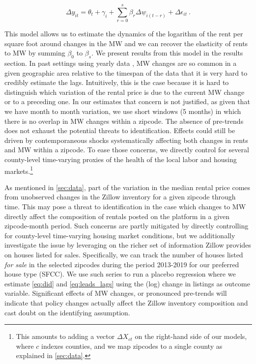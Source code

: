 \begin{equation}\label{eq:lags}
        \Delta y_{it} = \theta_t + \gamma_i 
        		+ \sum_{r=0}^{s}\beta_r \Delta \underline{w}_{i(t-r)} 
        		+ \Delta \epsilon_{it} \ .
\end{equation}

This model allows us to estimate the dynamics of the logarithm of the rent per square foot around 
changes in the MW and we can recover the elasticity of rents to MW by summing $\beta_0$ to 
$\beta_{s}$. We present results from this model in the results section. In past settings using 
yearly data \parencite{Tidemann2018, Yamagishi2019}, MW changes are so common in a given 
geographic area relative to the timespan of the data that it is very hard to credibly estimate the 
lags. Intuitively, this is the case because it is hard to distinguish which variation of the rental 
price is due to the current MW change or to a preceding one. In our estimates that concern is not 
justified, as given that we have month to month variation, we use short windows (5 months) in which 
there is no overlap in MW changes within a zipcode. The absence of pre-trends does not exhaust the 
potential threats to identification. Effects could still be driven by contemporaneous shocks 
systematically affecting both changes in rents and MW within a zipcode. To ease those concerns, we 
directly control for several county-level time-varying proxies of the health of the local labor and 
housing markets.\footnote{This amounts to adding a vector $\Delta X_{ct}$ on the right-hand side of 
	our models, where $c$ indexes counties, and we map zipcodes to a single county as explained in 
	\autoref{sec:data}.}

As mentioned in \autoref{sec:data}, part of the variation in the median rental price comes from 
unobserved changes in the Zillow inventory for a given zipcode through time. This may pose a threat 
to identification in the case which changes to MW directly affect the composition of rentals posted 
on the platform in a given zipcode-month period. Such concerns are partly mitigated by directly 
controlling for county-level time-varying housing market conditions, but we additionally investigate 
the issue by leveraging on the richer set of information Zillow provides on houses listed for sales. 
Specifically, we can track the number of houses listed \textit{for sale} in the selected zipcodes 
during the period 2013-2019 for our preferred house type (SFCC). We use such series to run a placebo 
regression where we estimate \autoref{eq:did} and \autoref{eq:leads_lags} using the (log) change in 
listings as outcome variable.  Significant effects of MW changes, or pronounced pre-trends will 
indicate that policy changes actually affect the Zillow inventory composition and cast doubt on the 
identifying assumption.

